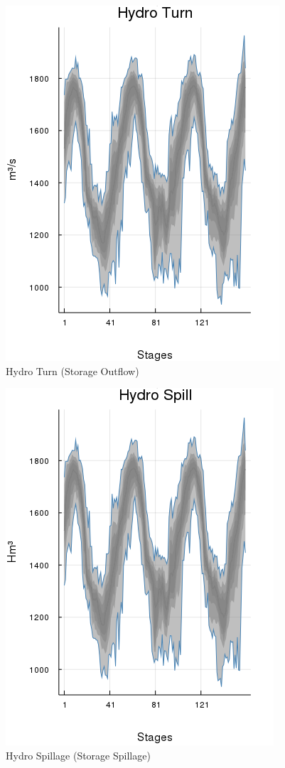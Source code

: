 \documentclass{juliacon}
\begin{document}
\begin{figure}[H]
\centerline{\includegraphics[width=0.55\linewidth]{fig/plot_agg_result_hydroturn.png}}
\caption{Hydro Turn (Storage Outflow)}
\label{fig:plot_agg_result_hydroturn}
\end{figure}

\begin{figure}[H]
\centerline{\includegraphics[width=0.5\linewidth]{fig/plot_agg_result_hydrospill.png}}
\caption{Hydro Spillage (Storage Spillage)}
\label{fig:plot_agg_result_hydrospill}
\end{figure}
\end{document}
